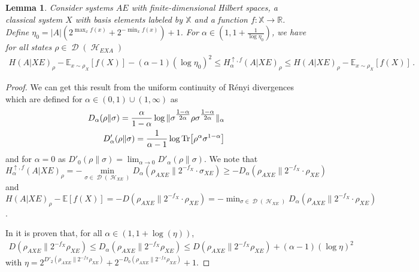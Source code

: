 \documentclass[11pt]{article}
\newcommand{\1}{\ensuremath{\mathbbm{1}}}
\theoremstyle{newdefinition}
\theoremstyle{newplain}
\newtheorem{lemma}[definition]{Lemma}
\theoremstyle{myplain}
\DeclareMathOperator{\cH}{\mathcal{H}}
\DeclareMathOperator{\cD}{\mathcal{D}}
\begin{document}
\begin{lemma}
    \label{lem:continutity} 
    Consider systems $AE$ with finite-dimensional Hilbert spaces, a classical system $X$ with basis elements labeled by $\mathbb{X}$ and a function $f:\mathbb{X}\to \mathbb{R}$. Define $\eta_0 = |A| (2^{\max_x f(x)} + 2^{-\min_x f(x)}) + 1$. For $\alpha \in (1,1+\frac{1}{\log \eta_0})$, we have for all states $\rho \in \cD(\cH_{EXA})$
    \begin{align}
    H(A|XE)_{\rho} - \mathbb E_{x \sim \rho_X}[f(X)] - (\alpha-1) (\log \eta_0)^2 \leq H^{\uparrow,f}_\alpha(A|XE)_{\rho} \leq H(A|XE)_{\rho} - \mathbb E_{x \sim \rho_X}[f(X)]\,.
    \end{align}
\end{lemma}
\begin{proof}
    We can get this result from the uniform continuity of Rényi divergences which are defined for $\alpha\in (0,1)\cup (1,\infty)$ as 
    \begin{align}
        D_\alpha(\rho \| \sigma) = \frac{\alpha}{1-\alpha} \log \|\sigma^{\tfrac{1-\alpha}{2\alpha}} \rho \sigma^{\tfrac{1-\alpha}{2\alpha}}\|_{\alpha}\\
        D'_\alpha(\rho \| \sigma) = \frac{1}{\alpha-1} \log \Tr[\rho^{\alpha} \sigma^{1-\alpha}]
    \end{align}
    and for $\alpha=0$ as $D'_0(\rho \| \sigma) = \lim_{\alpha\to 0}D'_\alpha(\rho \| \sigma)$.     We note that \[
    H^{\uparrow,f}_\alpha(A|XE)_{\rho} = - \min_{\sigma\in \cD(\cH_{XE})} D_\alpha(\rho_{AXE} \| 2^{-f_X}\cdot \sigma_{XE}) \geq - D_\alpha(\rho_{AXE} \| 2^{-f_X}\cdot \rho_{XE}) \] 
    and  $H(A|XE)_{\rho} - \mathbb E[f(X)] = - D(\rho_{AXE}\|2^{-f_X}\cdot \rho_{XE}) = - \min_{\sigma \in \cD(\cH_{XE})} D_{\alpha}(\rho_{AXE}\|2^{-f_X}\cdot \rho_{XE})$.
    
    In \cite[Lemma B.8 and Eq. (82)]{Dupuis.2020}  it is proven that, for all $\alpha\in (1,1+\log(\eta))$, 
    \begin{align}
    D(\rho_{AXE} \| 2^{-f_X}\rho_{XE}) \leq D_\alpha(\rho_{AXE} \| 2^{-f_X}\rho_{XE}) \leq D(\rho_{AXE} \| 2^{-f_X}\rho_{XE}) + (\alpha-1) (\log \eta)^2
    \end{align}
    with $\eta = 2^{D'_2(\rho_{AXE} \| 2^{-f_X} \rho_{XE})} + 2^{-D_0(\rho_{AXE} \| 2^{-f_X} \rho_{XE})} + 1$. 
    

\end{proof}
\end{document}
